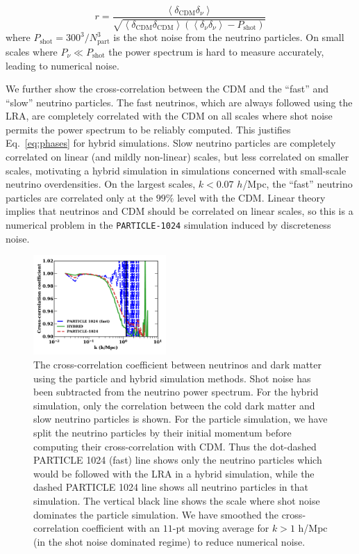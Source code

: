 \documentclass[useAMS, usenatbib]{mnras}
\begin{document}
\begin{equation}
 r = \frac{\left<\delta_\mathrm{CDM} \delta_\nu \right>}{\sqrt{\left<\delta_\mathrm{CDM} \delta_\mathrm{CDM} \right>\left(\left<\delta_\nu \delta_\nu \right> - P_\mathrm{shot}\right)}}
\end{equation}
where $P_\mathrm{shot} = 300^3 / N_\mathrm{part}^3$ is the shot noise from the neutrino particles. On small scales where $P_\nu \ll P_\mathrm{shot}$ the power spectrum is hard to measure accurately, leading to numerical noise.

We further show the cross-correlation between the CDM and the ``fast'' and ``slow'' neutrino particles. The fast neutrinos, which are always followed using the LRA, are completely correlated with the CDM on all scales where shot noise permits the power spectrum to be reliably computed. This justifies Eq.~\eqref{eq:phases} for hybrid simulations. Slow neutrino particles are completely correlated on linear (and mildly non-linear) scales, but less correlated on smaller scales, motivating a hybrid simulation in simulations concerned with small-scale neutrino overdensities. On the largest scales, $k < 0.07$ $h$/Mpc, the ``fast'' neutrino particles are correlated only at the $99\%$ level with the CDM. Linear theory implies that neutrinos and CDM should be correlated on linear scales, so this is a numerical problem in the \texttt{PARTICLE-1024} simulation induced by discreteness noise.

\begin{figure}
\includegraphics[width=0.45\textwidth]{nuplots/corr_coeff-1.pdf}
  \caption{The cross-correlation coefficient between neutrinos and dark matter using the particle and hybrid simulation methods. Shot noise has been subtracted from the neutrino power spectrum. For the hybrid simulation, only the correlation between the cold dark matter and slow neutrino particles is shown. For the particle simulation, we have split the neutrino particles by their initial momentum before computing their cross-correlation with CDM. Thus the dot-dashed PARTICLE 1024 (fast) line shows only the neutrino particles which would be followed with the LRA in a hybrid simulation, while the dashed PARTICLE 1024 line shows all neutrino particles in that simulation.
  The vertical black line shows the scale where shot noise dominates the particle simulation.
  We have smoothed the cross-correlation coefficient with an $11$-pt moving average for $k > 1$ h/Mpc (in the shot noise dominated regime) to reduce numerical noise.
  }
  \label{fig:cross-corr}
\end{figure}
\end{document}
